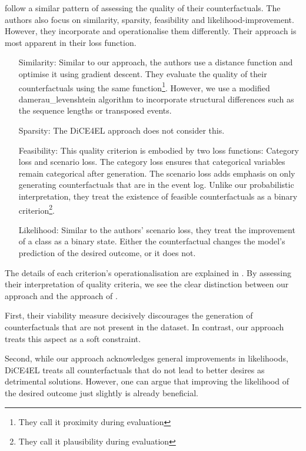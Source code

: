 \documentclass[./../../paper.tex]{subfiles}
\begin{document}
\citeauthor{hsieh_DiCE4ELInterpretingProcess_2021} follow a similar pattern of assessing the quality of their counterfactuals. The authors also focus on similarity, sparsity, feasibility and likelihood-improvement. However, they incorporate and operationalise them differently. Their approach is most apparent in their loss function.

\begin{itemize}
    \item[Similarity:] Similar to our approach, the authors use a distance function and optimise it using gradient descent. They evaluate the quality of their counterfactuals using the same function\footnote{They call it proximity during evaluation}. However, we use a modified \gls{damerau_levenshtein} algorithm to incorporate structural differences such as the sequence lengths or transposed events.      
    \item[Sparsity:] The DiCE4EL approach does not consider this.  
    \item[Feasibility:] This quality criterion is embodied by two loss functions: Category loss and scenario loss. The category loss ensures that categorical variables remain categorical after generation. The scenario loss adds emphasis on only generating counterfactuals that are in the event log. Unlike our probabilistic interpretation, they treat the existence of feasible counterfactuals as a binary criterion\footnote{They call it plausibility during evaluation}.   
    \item[Likelihood:] Similar to the authors' scenario loss, they treat the improvement of a class as a binary state. Either the counterfactual changes the model's prediction of the desired outcome, or it does not.
\end{itemize}

The details of each criterion's operationalisation are explained in \autocite{hsieh_DiCE4ELInterpretingProcess_2021}. By assessing their interpretation of quality criteria, we see the clear distinction between our approach and the approach of \citeauthor{hsieh_DiCE4ELInterpretingProcess_2021}. 

First, their viability measure decisively discourages the generation of counterfactuals that are not present in the dataset. In contrast, our approach treats this aspect as a soft constraint. 

Second, while our approach acknowledges general improvements in likelihoods, DiCE4EL treats all counterfactuals that do not lead to better desires as detrimental solutions. However, one can argue that improving the likelihood of the desired outcome just slightly is already beneficial.
\end{document}
